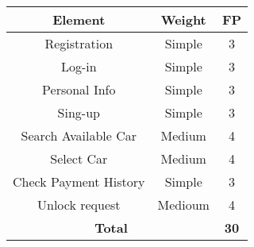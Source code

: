 \begin{center}
\begin{tabular}{|c|c|c|}
\hline
\multicolumn{1}{|c|}{\textbf{Element}} & \multicolumn{1}{c|}{\textbf{Weight}} & \multicolumn{1}{c|}{\textbf{FP}}\\
\hline
Registration				&Simple		&3\\
Log-in 						&Simple 	&3\\
Personal Info				&Simple		&3\\
Sing-up 					&Simple 	&3\\
Search Available Car		&Medium		&4\\
Select Car					&Medium		&4\\
Check Payment History		&Simple		&3\\
Unlock request				&Medioum	&4\\
\hline
\multicolumn{2}{|c|}{\textbf{Total}} & \multicolumn{1}{c|}{\textbf{30}}\\
\hline
\end{tabular}

\end{center}


